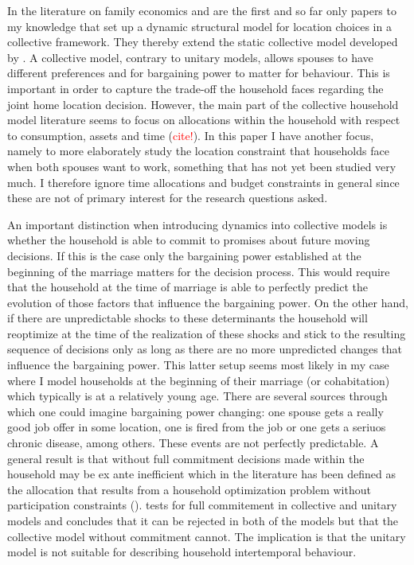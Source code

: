 In the literature on family economics \cite{LundbergPollak2003} and \cite{Gemici2011} are the first and so far only papers to my knowledge that set up a dynamic structural model for location choices in a collective framework. They thereby extend the static collective model developed by \cite{Chiappori1988,Chiappori1992}. A collective model, contrary to unitary models, allows spouses to have different preferences and for bargaining power to matter for behaviour. This is important in order to capture the trade-off the household faces regarding the joint home location decision. However, the main part of the collective household model literature seems to focus on allocations within the household with respect to consumption, assets and time (\textcolor{red}{cite!}). In this paper I have another focus, namely to more elaborately study the location constraint that households face when both spouses want to work, something that has not yet been studied very much. I therefore ignore time allocations and budget constraints in general since these are not of primary interest for the research questions asked. 

An important distinction when introducing dynamics into collective models is whether the household is able to commit to promises about future moving decisions. If this is the case only the bargaining power established at the beginning of the marriage matters for the decision process. This would require that the household at the time of marriage is able to perfectly predict the evolution of those factors that influence the bargaining power. On the other hand, if there are unpredictable shocks to these determinants the household will reoptimize at the time of the realization of these shocks and stick to the resulting sequence of decisions only as long as there are no more unpredicted changes that influence the bargaining power. This latter setup seems most likely in my case where I model households at the beginning of their marriage (or cohabitation) which typically is at a relatively young age. There are several sources through which one could imagine bargaining power changing: one spouse gets a really good job offer in some location, one is fired from the job or one gets a seriuos chronic disease, among others. These events are not perfectly predictable. A general result is that without full commitment decisions made within the household may be ex ante inefficient which in the literature has been defined as the allocation that results from a household optimization problem without participation constraints (\cite{LundbergPollak2003,Ligon2011,Theloudis2016}). \cite{Mazzocco2007} tests for full commitement in collective and unitary models and concludes that it can be rejected in both of the models but that the collective model without commitment cannot. The implication is that the unitary model is not suitable for describing household intertemporal behaviour. 

